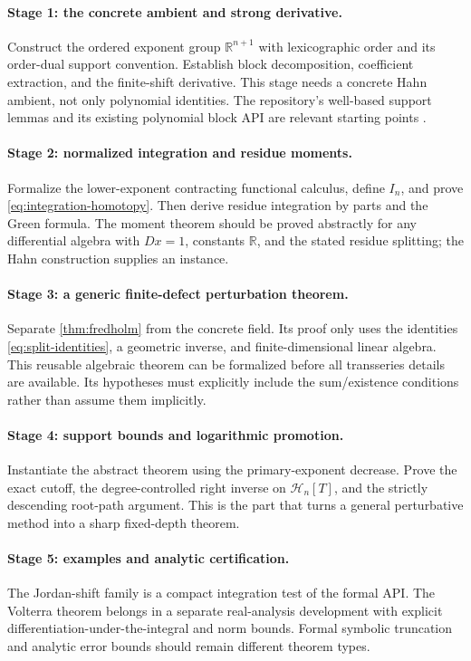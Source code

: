 \documentclass[11pt,a4paper]{article}
\numberwithin{equation}{section}
\theoremstyle{definition}
\theoremstyle{remark}
\newcommand{\R}{\mathbb R}
\newcommand{\HH}{\mathcal H}
\begin{document}
\paragraph{Stage 1: the concrete ambient and strong derivative.}
Construct the ordered exponent group $\R^{n+1}$ with lexicographic order and its order-dual support convention. Establish block decomposition, coefficient extraction, and the finite-shift derivative. This stage needs a concrete Hahn ambient, not only polynomial identities. The repository's well-based support lemmas and its existing polynomial block API are relevant starting points \cite{repo-volume,repo-block}.

\paragraph{Stage 2: normalized integration and residue moments.}
Formalize the lower-exponent contracting functional calculus, define $I_n$, and prove \eqref{eq:integration-homotopy}. Then derive residue integration by parts and the Green formula. The moment theorem should be proved abstractly for any differential algebra with $Dx=1$, constants $\R$, and the stated residue splitting; the Hahn construction supplies an instance.

\paragraph{Stage 3: a generic finite-defect perturbation theorem.}
Separate \cref{thm:fredholm} from the concrete field. Its proof only uses the identities \eqref{eq:split-identities}, a geometric inverse, and finite-dimensional linear algebra. This reusable algebraic theorem can be formalized before all transseries details are available. Its hypotheses must explicitly include the sum/existence conditions rather than assume them implicitly.

\paragraph{Stage 4: support bounds and logarithmic promotion.}
Instantiate the abstract theorem using the primary-exponent decrease. Prove the exact cutoff, the degree-controlled right inverse on $\HH_n[T]$, and the strictly descending root-path argument. This is the part that turns a general perturbative method into a sharp fixed-depth theorem.

\paragraph{Stage 5: examples and analytic certification.}
The Jordan-shift family is a compact integration test of the formal API. The Volterra theorem belongs in a separate real-analysis development with explicit differentiation-under-the-integral and norm bounds. Formal symbolic truncation and analytic error bounds should remain different theorem types.
\end{document}
